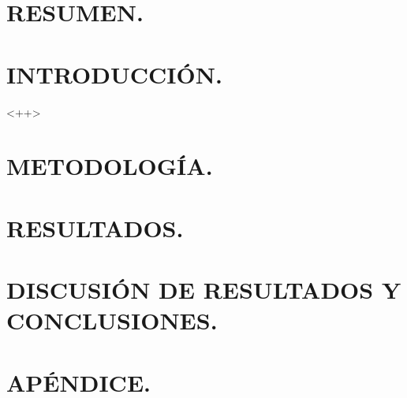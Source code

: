 


\portada

\section{RESUMEN.} %

\section{INTRODUCCIÓN.} %
<++>

\section{METODOLOGÍA.} %

\section{RESULTADOS.} %

\section{DISCUSIÓN DE RESULTADOS Y CONCLUSIONES.} %

% 
% 

\section{APÉNDICE.} %


